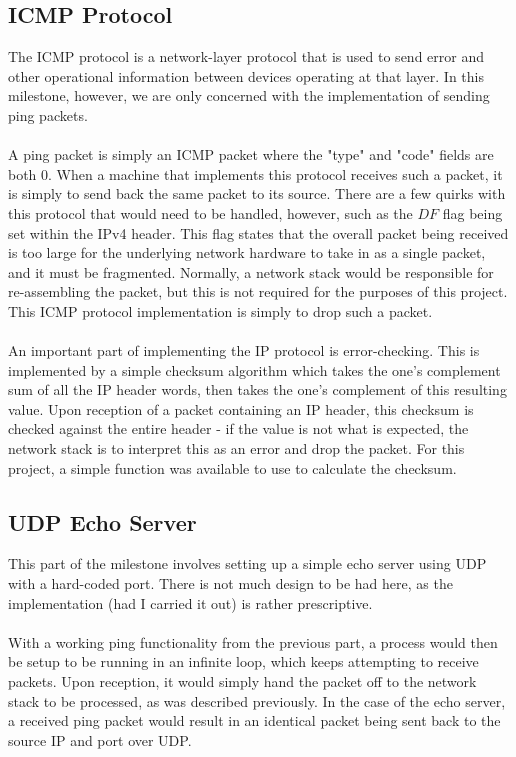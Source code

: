 \subsection{ICMP Protocol}
The ICMP protocol is a network-layer protocol that is used to send error and other operational information between devices operating at that layer. In this milestone, however, we are only concerned with the implementation of sending ping packets.
\\\\
A ping packet is simply an ICMP packet where the "type" and "code" fields are both 0. When a machine that implements this protocol receives such a packet, it is simply to send back the same packet to its source. There are a few quirks with this protocol that would need to be handled, however, such as the $DF$ flag being set within the IPv4 header. This flag states that the overall packet being received is too large for the underlying network hardware to take in as a single packet, and it must be fragmented. Normally, a network stack would be responsible for re-assembling the packet, but this is not required for the purposes of this project. This ICMP protocol implementation is simply to drop such a packet.
\\\\
An important part of implementing the IP protocol is error-checking. This is implemented by a simple checksum algorithm which takes the one's complement sum of all the IP header words, then takes the one's complement of this resulting value. Upon reception of a packet containing an IP header, this checksum is checked against the entire header - if the value is not what is expected, the network stack is to interpret this as an error and drop the packet. For this project, a simple function was available to use to calculate the checksum.

\subsection{UDP Echo Server}
This part of the milestone involves setting up a simple echo server using UDP with a hard-coded port. There is not much design to be had here, as the implementation (had I carried it out) is rather prescriptive.
\\\\
With a working ping functionality from the previous part, a process would then be setup to be running in an infinite loop, which keeps attempting to receive packets. Upon reception, it would simply hand the packet off to the network stack to be processed, as was described previously. In the case of the echo server, a received ping packet would result in an identical packet being sent back to the source IP and port over UDP.

